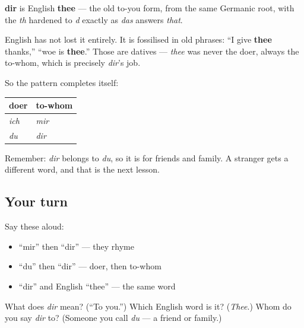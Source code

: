 \begin{cousinweb}
\textbf{dir} is English \textbf{thee} — the old to-you form, from the same Germanic root, with the \emph{th} hardened to \emph{d} exactly as \emph{das} answers \emph{that}.

English has not lost it entirely. It is fossilised in old phrases: \textquotedblleft{}I give \textbf{thee} thanks,\textquotedblright{} \textquotedblleft{}woe is \textbf{thee}.\textquotedblright{} Those are datives — \emph{thee} was never the doer, always the to-whom, which is precisely \emph{dir}'s job.

So the pattern completes itself:

\noindent
\begin{tabularx}{\linewidth}{@{}>{\raggedright\arraybackslash}X>{\raggedright\arraybackslash}X@{}}
\toprule
\textbf{doer} & \textbf{to-whom} \\
\midrule
\emph{ich} & \emph{mir} \\
\emph{du} & \emph{dir} \\
\bottomrule
\end{tabularx}

Remember: \emph{dir} belongs to \emph{du}, so it is for friends and family. A stranger gets a different word, and that is the next lesson.
\end{cousinweb}

\subsection*{Your turn}
Say these aloud:

\begin{itemize}
\raggedright
  \item \textquotedblleft{}mir\textquotedblright{} then \textquotedblleft{}dir\textquotedblright{} — they rhyme
  \item \textquotedblleft{}du\textquotedblright{} then \textquotedblleft{}dir\textquotedblright{} — doer, then to-whom
  \item \textquotedblleft{}dir\textquotedblright{} and English \textquotedblleft{}thee\textquotedblright{} — the same word
\end{itemize}

\begin{tcolorbox}[breakable,colback=teal!4,colframe=teal!35!black,title={Before you move on}]
What does \emph{dir} mean? (\textquotedblleft{}To you.\textquotedblright{}) Which English word is it? (\emph{Thee}.) Whom do you say \emph{dir} to? (Someone you call \emph{du} — a friend or family.)
\end{tcolorbox}

